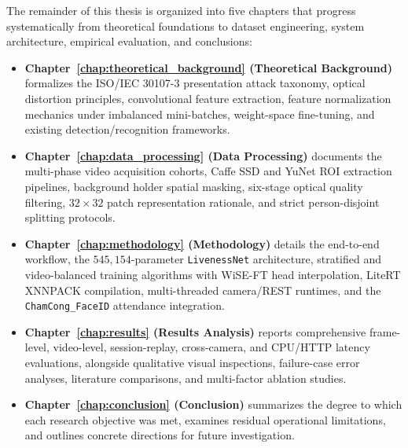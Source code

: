 The remainder of this thesis is organized into five chapters that progress systematically from theoretical foundations to dataset engineering, system architecture, empirical evaluation, and conclusions:
\begin{itemize}
    \item \textbf{Chapter~\ref{chap:theoretical_background} (Theoretical Background)} formalizes the ISO/IEC 30107-3 presentation attack taxonomy, optical distortion principles, convolutional feature extraction, feature normalization mechanics under imbalanced mini-batches, weight-space fine-tuning, and existing detection/recognition frameworks.
    \item \textbf{Chapter~\ref{chap:data_processing} (Data Processing)} documents the multi-phase video acquisition cohorts, Caffe SSD and YuNet ROI extraction pipelines, background holder spatial masking, six-stage optical quality filtering, $32\times32$ patch representation rationale, and strict person-disjoint splitting protocols.
    \item \textbf{Chapter~\ref{chap:methodology} (Methodology)} details the end-to-end workflow, the $545{,}154$-parameter \texttt{LivenessNet} architecture, stratified and video-balanced training algorithms with WiSE-FT head interpolation, LiteRT XNNPACK compilation, multi-threaded camera/REST runtimes, and the \texttt{ChamCong\_FaceID} attendance integration.
    \item \textbf{Chapter~\ref{chap:results} (Results Analysis)} reports comprehensive frame-level, video-level, session-replay, cross-camera, and CPU/HTTP latency evaluations, alongside qualitative visual inspections, failure-case error analyses, literature comparisons, and multi-factor ablation studies.
    \item \textbf{Chapter~\ref{chap:conclusion} (Conclusion)} summarizes the degree to which each research objective was met, examines residual operational limitations, and outlines concrete directions for future investigation.
\end{itemize}
